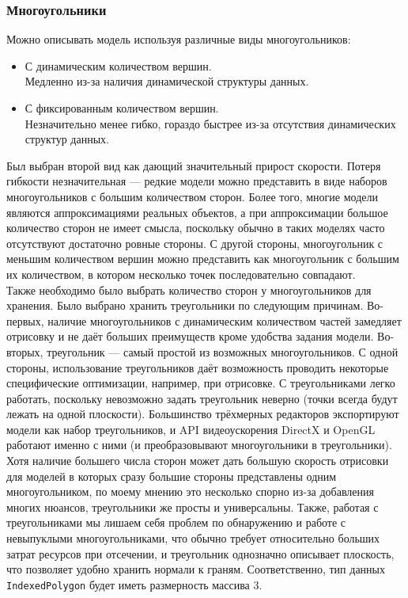 \documentclass[a4paper,12pt]{report}
\numberwithin{equation}{section}
\begin{document}
\subsubsection{Многоугольники}
Можно описывать модель используя различные виды многоугольников:
\begin{itemize}
\item С динамическим количеством вершин. \\
Медленно из-за наличия динамической структуры данных.
\item С фиксированным количеством вершин. \\
Незначительно менее гибко, гораздо быстрее из-за отсутствия динамических структур данных.
\end{itemize}
Был выбран второй вид как дающий значительный прирост скорости. Потеря гибкости незначительная --- редкие модели можно представить в виде наборов многоугольников с большим количеством сторон. Более того, многие модели являются аппроксимациями реальных объектов, а при аппроксимации большое количество сторон не имеет смысла, поскольку обычно в таких моделях часто отсутствуют достаточно ровные стороны. С другой стороны, многоугольник с меньшим количеством вершин можно представить как многоугольник с большим их количеством, в котором несколько точек последовательно совпадают. \\
Также необходимо было выбрать количество сторон у многоугольников для хранения. Было выбрано хранить треугольники по следующим причинам. Во-первых, наличие многоугольников с динамическим количеством частей замедляет отрисовку и не даёт больших преимуществ кроме удобства задания модели. Во-вторых, треугольник --- самый простой из возможных многоугольников. С одной стороны, использование треугольников даёт возможность проводить некоторые специфические оптимизации, например, при отрисовке. С треугольниками легко работать, поскольку невозможно задать треугольник неверно (точки всегда будут лежать на одной плоскости). Большинство трёхмерных редакторов экспортируют модели как набор треугольников, и API видеоускорения DirectX и OpenGL работают именно с ними (и преобразовывают многоугольники в треугольники). Хотя наличие большего числа сторон может дать большую скорость отрисовки для моделей в которых сразу большие стороны представлены одним многоугольником, по моему мнению это несколько спорно из-за добавления многих нюансов, треугольники же просты и универсальны. Также, работая с треугольниками мы лишаем себя проблем по обнаружению и работе с невыпуклыми многоугольниками, что обычно требует относительно больших затрат ресурсов при отсечении, и треугольник однозначно описывает плоскость, что позволяет удобно хранить нормали к граням. Соответственно, тип данных \texttt{IndexedPolygon} будет иметь размерность массива 3.
\end{document}
